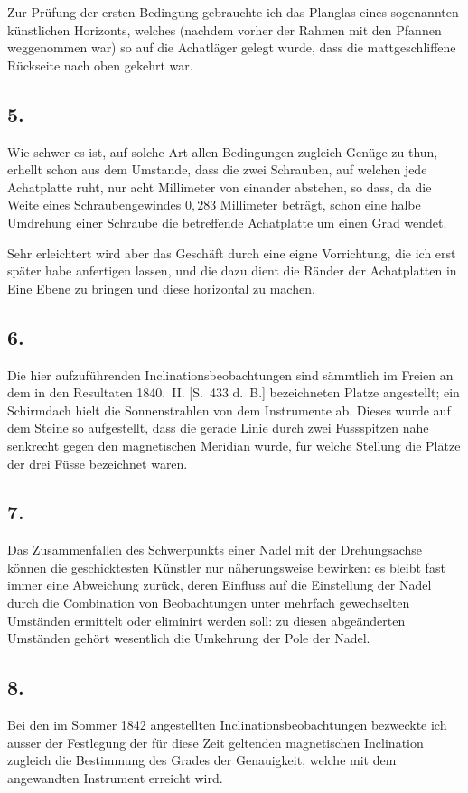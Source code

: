 \documentclass[12pt,a4paper]{article}
\begin{document}
Zur Prüfung der ersten Bedingung gebrauchte ich das Planglas eines sogenannten künstlichen Horizonts, welches (nachdem vorher der Rahmen mit den Pfannen weggenommen war) so auf die Achatläger gelegt wurde, dass die mattgeschliffene Rückseite nach oben gekehrt war.

\subsection*{5.}
Wie schwer es ist, auf solche Art allen Bedingungen zugleich Genüge zu thun, erhellt schon aus dem Umstande, dass die zwei Schrauben, auf welchen jede Achatplatte ruht, nur acht Millimeter von einander abstehen, so dass, da die Weite eines Schraubengewindes $0{,}283$ Millimeter beträgt, schon eine halbe Umdrehung einer Schraube die betreffende Achatplatte um einen Grad wendet.

Sehr erleichtert wird aber das Geschäft durch eine eigne Vorrichtung, die ich erst später habe anfertigen lassen, und die dazu dient die Ränder der Achatplatten in Eine Ebene zu bringen und diese horizontal zu machen.

\subsection*{6.}
Die hier aufzuführenden Inclinationsbeobachtungen sind sämmtlich im Freien an dem in den Resultaten 1840.~II. [S.~433 d.~B.] bezeichneten Platze angestellt; ein Schirmdach hielt die Sonnenstrahlen von dem Instrumente ab. Dieses wurde auf dem Steine so aufgestellt, dass die gerade Linie durch zwei Fussspitzen nahe senkrecht gegen den magnetischen Meridian wurde, für welche Stellung die Plätze der drei Füsse bezeichnet waren.

\subsection*{7.}
Das Zusammenfallen des Schwerpunkts einer Nadel mit der Drehungsachse können die geschicktesten Künstler nur näherungsweise bewirken: es bleibt fast immer eine Abweichung zurück, deren Einfluss auf die Einstellung der Nadel durch die Combination von Beobachtungen unter mehrfach gewechselten Umständen ermittelt oder eliminirt werden soll: zu diesen abgeänderten Umständen gehört wesentlich die Umkehrung der Pole der Nadel.

\subsection*{8.}
Bei den im Sommer 1842 angestellten Inclinationsbeobachtungen bezweckte ich ausser der Festlegung der für diese Zeit geltenden magnetischen Inclination zugleich die Bestimmung des Grades der Genauigkeit, welche mit dem angewandten Instrument erreicht wird.
\end{document}
